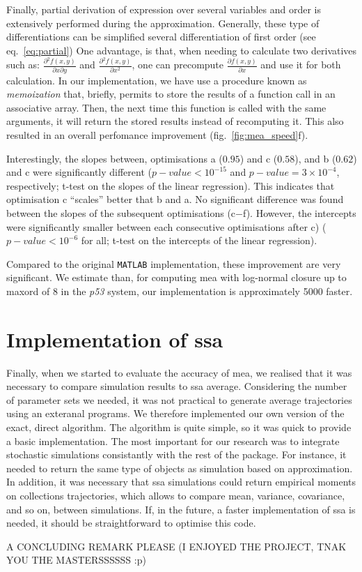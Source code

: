 \documentclass[11pt,a4paper]{article}
\newcommand{\pft}{\textit{p53}}
\newcommand{\mat}{\texttt{MATLAB}}
\begin{document}
Finally, partial derivation of expression over several variables and order is extensively performed during the approximation.
Generally, these type of differentiations can be simplified several differentiation of first order (see eq.~\ref{eq:partial})
One advantage, is that, when needing to calculate two derivatives such as: $\frac{\partial{} ^ 2 f(x,y)}{\partial{} x \partial{} y}$ and $\frac{\partial{} ^ 2 f(x,y)}{\partial{} x^2}$,
one can precompute $\frac{\partial{} f(x,y)}{\partial{} x}$ and use it for both calculation.
In our implementation, we have use a procedure known as \emph{memoization} that, briefly, permits to store the results of a function call in an associative array.
Then, the next time this function is called with the same arguments, it will return the stored results instead of recomputing it.
This also resulted in an overall perfomance improvement (fig.~\ref{fig:mea_speed}f).

Interestingly, the slopes between, optimisations a ($0.95$) and c ($0.58$), and b ($0.62$) and c were significantly different ($p-value <10^{-15}$ and $p-value = 3 \times 10^{-4}$, respectively;
t-test on the slopes of the linear regression). This indicates that optimisation c ``scales'' better that b and a.
No significant difference was found between the slopes of the subsequent optimisations (c$-$f). 
However, the intercepts were significantly smaller between each consecutive optimisations after c) ($p-value < 10^{-6}$ for all; t-test on the intercepts of the linear regression).

Compared to the original \mat{} implementation, these improvement are very significant. We estimate than, for computing \gls{mea} with log-normal closure up to \gls{maxord}
of 8 in the \pft{} system, our implementation is approximately 5000 faster.

\section{Implementation of \acrlong{ssa}}
Finally, when we started to evaluate the accuracy of \gls{mea}, we realised that it was necessary to compare simulation results to \gls{ssa} average\cite{gillespie_general_19706}.
Considering the number of parameter sets we needed, it was not practical to generate average trajectories using an exteranal programs.
We therefore implemented our own version of the exact, direct algorithm.
The algorithm is quite simple, so it was quick to provide a basic implementation. 
The most important for our research was to integrate stochastic simulations consistantly with the rest of the package.
For instance, it needed to return the same type of objects as simulation based on approximation. 
In addition, it was necessary that \gls{ssa} simulations could return empirical moments on collections trajectories, which allows to compare mean, variance, covariance, and so on, between simulations.
If, in the future, a faster implementation of \gls{ssa} is needed, it should be straightforward to optimise this code. 

A CONCLUDING REMARK PLEASE (I ENJOYED THE PROJECT, TNAK YOU THE MASTERSSSSSS :p)

\newpage{}
{}

\end{document}
